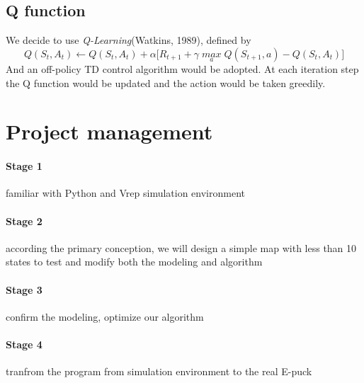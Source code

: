 \documentclass[
11pt, %
a4paper, %
oneside, %
headinclude%
BCOR3mm, %
]{scrartcl}
\begin{document}
\subsection{Q function}
\quad
We decide to use \textsl{Q-Learning}(Watkins, 1989), defined by
\begin{equation}
\mathit{Q(S_t,A_t)\xleftarrow{}  Q(S_t,A_t)+ }\alpha \mathit{[ R_{t+1} + }\gamma \mathit{\max \limits_{a}Q(S_{t+1},a)-Q(S_t,A_t)]}
\end{equation}
\quad And an off-policy TD control algorithm would be adopted.
At each iteration step the Q function would be updated and the action would be taken greedily.



\section{Project management}

\paragraph{Stage 1} familiar with Python and Vrep simulation environment

\paragraph{Stage 2} according the primary conception, 
we will design a simple map with less than 10 states to test and modify both the modeling and algorithm

\paragraph{Stage 3} confirm the modeling, optimize our algorithm
\paragraph{Stage 4} tranfrom the program from simulation environment to the real E-puck
\end{document}
